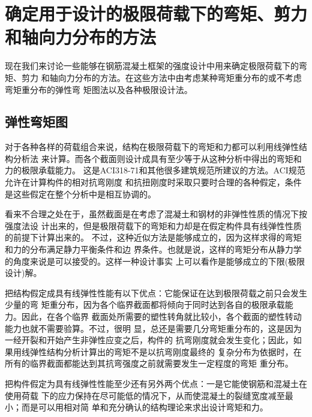 \documentclass[12pt,a4paper]{book}
\begin{document}
\section{确定用于设计的极限荷载下的弯矩、剪力和轴向力分布的方法}

现在我们来讨论一些能够在钢筋混凝土框架的强度设计中用来确定极限荷载下的弯矩、剪力
和轴向力分布的方法。在这些方法中由考虑某种弯矩重分布的或不考虑弯矩重分布的弹性弯
矩图法以及各种极限设计法。

\subsection{弹性弯矩图}

对于各种各样的荷载组合来说，结构在极限荷载下的弯矩和力都可以利用线弹性结构分析法
来计算。而各个截面则设计成具有至少等于从这种分析中得出的弯矩和力的极限承载能力。
这是ACI318-71和其他很多建筑规范所建议的方法。ACI规范允许在计算构件的相对抗弯刚度
和抗扭刚度时采取只要时合理的各种假定，条件是这些假定在整个分析中是相互协调的。

看来不合理之处在于，虽然截面是在考虑了混凝土和钢材的非弹性性质的情况下按强度法设
计出来的，但是极限荷载下的弯矩和力却是在假定构件具有线弹性性质的前提下计算出来的。
不过，这种近似方法是能够成立的，因为这样求得的弯矩和力的分布满足静力平衡条件和边
界条件。也就是说，这样的弯矩分布从静力学的角度来说是可以接受的。这样一种设计事实
上可以看作是能够成立的下限(极限设计)解。

把结构假定成具有线弹性性能有以下优点：它能保证在达到极限荷载之前只会发生少量的弯
矩重分布，因为各个临界截面都将倾向于同时达到各自的极限承载能力。因此，在各个临界
截面处所需要的塑性转角就比较小，各个截面的塑性转动能力也就不需要验算。不过，很明
显，总还是需要几分弯矩重分布的，这是因为一经开裂和开始产生非弹性应变之后，构件的
抗弯刚度就会发生变化；因此，如果用线弹性结构分析计算出的弯矩不是以抗弯刚度最终的
复杂分布为依据时，在所有的临界截面都能达到其抗弯强度之前就需要发生一定程度的弯矩
重分布。

把构件假定为具有线弹性性能至少还有另外两个优点：一是它能使钢筋和混凝土在使用荷载
下的应力保持在尽可能低的情况下，从而使混凝土的裂缝宽度减至最小；而是可以用相对简
单和充分确认的结构理论来求出设计弯矩和力。
\end{document}
